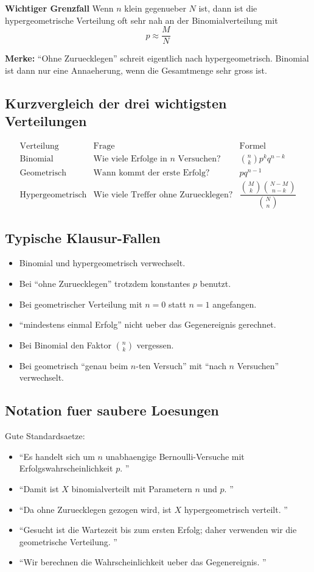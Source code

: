 \documentclass[a4paper,11pt]{article}
\begin{document}
\textbf{Wichtiger Grenzfall}
Wenn $n$ klein gegenueber $N$ ist, dann ist die hypergeometrische Verteilung oft sehr nah an der Binomialverteilung mit
\[
p \approx \frac{M}{N}
\]

\textbf{Merke:}
``Ohne Zuruecklegen'' schreit eigentlich nach hypergeometrisch. Binomial ist dann nur eine Annaeherung, wenn die Gesamtmenge sehr gross ist.

\subsection{Kurzvergleich der drei wichtigsten Verteilungen}
\[
\begin{array}{c|c|c}
\text{Verteilung} & \text{Frage} & \text{Formel} \\
\hline
\text{Binomial} & \text{Wie viele Erfolge in } n \text{ Versuchen?} &
\binom{n}{k}p^k q^{n-k} \\
\text{Geometrisch} & \text{Wann kommt der erste Erfolg?} &
p q^{n-1} \\
\text{Hypergeometrisch} & \text{Wie viele Treffer ohne Zuruecklegen?} &
\dfrac{\binom{M}{k}\binom{N-M}{n-k}}{\binom{N}{n}}
\end{array}
\]

\subsection{Typische Klausur-Fallen}
\begin{itemize}
  \item Binomial und hypergeometrisch verwechselt.
  \item Bei ``ohne Zuruecklegen'' trotzdem konstantes $p$ benutzt.
  \item Bei geometrischer Verteilung mit $n=0$ statt $n=1$ angefangen.
  \item ``mindestens einmal Erfolg'' nicht ueber das Gegenereignis gerechnet.
  \item Bei Binomial den Faktor $\binom{n}{k}$ vergessen.
  \item Bei geometrisch ``genau beim $n$-ten Versuch'' mit ``nach $n$ Versuchen'' verwechselt.
\end{itemize}

\subsection{Notation fuer saubere Loesungen}
Gute Standardsaetze:
\begin{itemize}
  \item ``Es handelt sich um $n$ unabhaengige Bernoulli-Versuche mit Erfolgswahrscheinlichkeit $p$. ''
  \item ``Damit ist $X$ binomialverteilt mit Parametern $n$ und $p$. ''
  \item ``Da ohne Zuruecklegen gezogen wird, ist $X$ hypergeometrisch verteilt. ''
  \item ``Gesucht ist die Wartezeit bis zum ersten Erfolg; daher verwenden wir die geometrische Verteilung. ''
  \item ``Wir berechnen die Wahrscheinlichkeit ueber das Gegenereignis. ''
\end{itemize}
\end{document}
